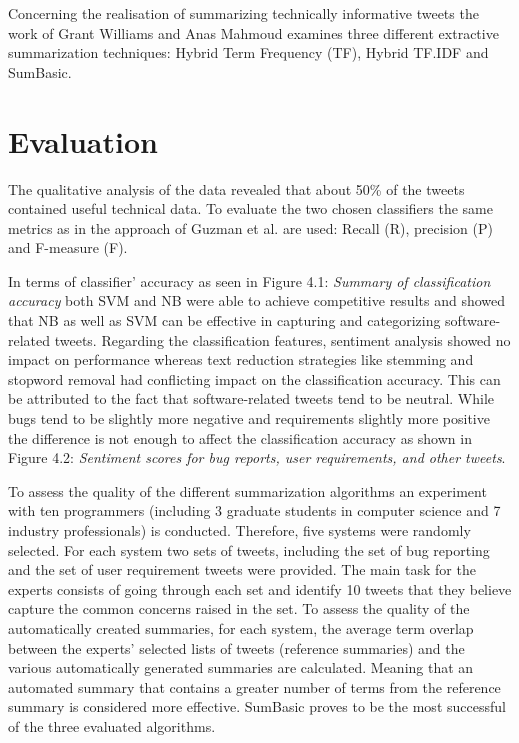 \documentclass[a4paper,10pt, bibliography=totocnumbered]{scrreprt}
\begin{document}
Concerning the realisation of summarizing technically informative tweets the work of Grant Williams and Anas Mahmoud \cite{Williams} examines three different extractive summarization techniques: Hybrid Term Frequency (TF), Hybrid TF.IDF and SumBasic.


\section{Evaluation}

The qualitative analysis of the data revealed that about 50\% of the tweets contained useful technical data.
To evaluate the two chosen classifiers the same metrics as in the approach of Guzman et al. \cite{Guzman} are used: Recall (R), precision (P) and F-measure (F).

In terms of classifier' accuracy as seen in Figure 4.1: \textit{Summary of classification accuracy} both SVM and NB were able to achieve competitive results and showed that NB as well as SVM can be effective in capturing and categorizing software-related tweets. Regarding the classification features, sentiment analysis showed no impact on performance whereas text reduction strategies like stemming and stopword removal had conflicting impact on the classification accuracy.
This can be attributed to the fact that software-related tweets tend to be neutral. While bugs tend to be slightly more negative and requirements slightly more positive the difference is not enough to affect the classification accuracy as shown in Figure 4.2: \textit{Sentiment scores for bug reports, user requirements, and other tweets}.

To assess the quality of the different summarization algorithms an experiment with ten programmers (including 3 graduate students in computer science and 7 industry professionals) is conducted. 
Therefore, five systems were randomly selected. For each system two sets of tweets, including the set of bug reporting and the set of user requirement tweets were provided. The main task for the experts consists of going through each set and identify 10 tweets that they believe capture the common concerns raised in the set. 
To assess the quality of the automatically created summaries, for each system, the average term overlap between the experts' selected lists of tweets (reference summaries) and the various automatically generated summaries are calculated. Meaning that an automated summary that contains a greater number of terms from the reference summary is considered more effective. 
SumBasic proves to be the most successful of the three evaluated algorithms.
\end{document}
